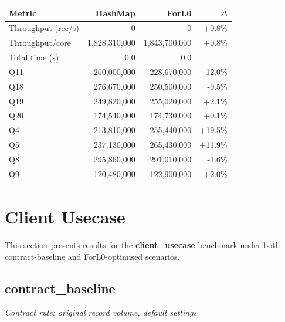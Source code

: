 \documentclass[11pt,a4paper]{article}
\begin{document}
\begin{table}[h]
\centering
\begin{tabular}{lrrr}
\toprule
\textbf{Metric} & \textbf{HashMap} & \textbf{ForL0} & $\Delta$ \\
\midrule

Throughput (rec/s) & 0 & 0 & +0.8\% \\

Throughput/core & 1,828,310,000 & 1,843,700,000 & +0.8\% \\

Total time (s) & 0.0 & 0.0 &  \\

  Q11 & 260,000,000 & 228,670,000 & -12.0\% \\

  Q18 & 276,670,000 & 250,500,000 & -9.5\% \\

  Q19 & 249,820,000 & 255,020,000 & +2.1\% \\

  Q20 & 174,540,000 & 174,730,000 & +0.1\% \\

  Q4 & 213,810,000 & 255,440,000 & +19.5\% \\

  Q5 & 237,130,000 & 265,430,000 & +11.9\% \\

  Q8 & 295,860,000 & 291,010,000 & -1.6\% \\

  Q9 & 120,480,000 & 122,900,000 & +2.0\% \\

\bottomrule
\end{tabular}
\end{table}




\section{Client Usecase}

This section presents results for the \textbf{client\_usecase} benchmark under both contract-baseline and ForL0-optimised scenarios.


\subsection{contract\_baseline}

\textit{Contract rule: original record volume, default settings}
\end{document}
